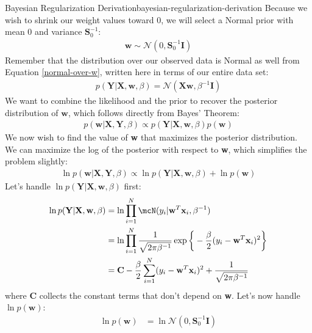 \begin{derivation}{Bayesian Regularization Derivation}{bayesian-regularization-derivation}
    Because we wish to shrink our weight values toward 0, we will select a Normal prior with mean 0 and variance $\boldsymbol{S}_{0}^{-1}$:
    \begin{align*}
        \textbf{w} \sim \mathcal{N}(0, \boldsymbol{S}_{0}^{-1}\textbf{I})
    \end{align*}
    Remember that the distribution over our observed data is Normal as well from Equation \ref{normal-over-w}, written here in terms of our entire data set:
    \begin{align*}
        p(\textbf{Y} | \textbf{X}, \textbf{w}, \beta) = \mathcal{N}(\textbf{X}\textbf{w}, \beta^{-1}\textbf{I})
    \end{align*}
    We want to combine the likelihood and the prior to recover the posterior distribution of $\textbf{w}$, which follows directly from Bayes' Theorem:
    \begin{align*}
        p(\textbf{w}|\textbf{X},\textbf{Y}, \beta) \propto p(\textbf{Y}| \textbf{X}, \textbf{w}, \beta)p(\textbf{w})
    \end{align*}
    We now wish to find the value of \textbf{w} that maximizes the posterior distribution. We can maximize the log of the posterior with respect to \textbf{w}, which simplifies the problem slightly:
    \begin{align*}
        \ln{p(\textbf{w}|\textbf{X},\textbf{Y}, \beta)} \propto \ln{p(\textbf{Y}| \textbf{X}, \textbf{w}, \beta)} + \ln{p(\textbf{w})}
    \end{align*}
    Let's handle $\ln{p(\textbf{Y}| \textbf{X}, \textbf{w}, \beta)}$ first:
    \begin{align*}
        \ln{p(\textbf{Y}| \textbf{X}, \textbf{w}, \beta)} &= \ln{\prod_{i=1}^{N} \mcN(y_{i} | \textbf{w}^{T} \textbf{x}_{i}, \beta^{-1})} \\
        &= \ln{\prod_{i=1}^{N} \frac{1}{\sqrt{2\pi\beta^{-1}}} \exp{\bigg\{-\frac{\beta}{2}(y_{i} - \textbf{w}^{T} \textbf{x}_{i})^2\bigg\}}} \\
        &= \textbf{C} -\frac{\beta}{2}\sum_{i=1}^{N} (y_{i} - \textbf{w}^{T} \textbf{x}_{i})^2 + \frac{1}{\sqrt{2\pi\beta^{-1}}}
    \end{align*}
    where \textbf{C} collects the constant terms that don't depend on \textbf{w}. Let's now handle $\ln{p(\textbf{w})}$:
    \begin{align*}
        \ln{p(\textbf{w})} &= \ln{\mathcal{N}(0, \boldsymbol{S}_{0}^{-1}\textbf{I})} \\

\end{align*}
\end{derivation}
